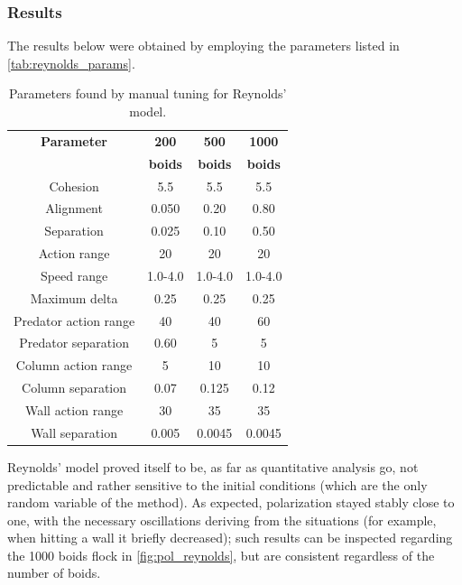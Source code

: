 \subsubsection{Results}
The results below were obtained by employing the parameters listed in \autoref{tab:reynolds_params}. \\
\begin{table}[ht]
    \centering
    \begin{tabular}{|c|c|c|c|}
        \hline
        \textbf{Parameter}    & \textbf{200}   & \textbf{500}   & \textbf{1000}  \\
                              & \textbf{boids} & \textbf{boids} & \textbf{boids} \\ \hline
        Cohesion              & 5.5            & 5.5            & 5.5            \\ \hline
        Alignment             & 0.050          & 0.20           & 0.80           \\ \hline
        Separation            & 0.025          & 0.10           & 0.50           \\ \hline
        Action range          & 20             & 20             & 20             \\ \hline
        Speed range           & 1.0-4.0        & 1.0-4.0        & 1.0-4.0        \\ \hline
        Maximum delta         & 0.25           & 0.25           & 0.25           \\ \hline
        Predator action range & 40             & 40             & 60             \\ \hline
        Predator separation   & 0.60           & 5              & 5              \\ \hline
        Column action range   & 5              & 10             & 10             \\ \hline
        Column separation     & 0.07           & 0.125          & 0.12           \\ \hline
        Wall action range     & 30             & 35             & 35             \\ \hline
        Wall separation       & 0.005          & 0.0045         &
        0.0045                                                                   \\ \hline\end{tabular}
    \caption{Parameters found by manual tuning for Reynolds' model.}
    \label{tab:reynolds_params}
\end{table}
Reynolds' model proved itself to be, as far as quantitative analysis go, not predictable and rather sensitive to the initial conditions (which are the only random variable of the method). As expected, polarization stayed stably close to one, with the necessary oscillations deriving from the situations (for example, when hitting a wall it briefly decreased); such results can be inspected regarding the 1000 boids flock in \autoref{fig:pol_reynolds}, but are consistent regardless of the number of boids. \\
